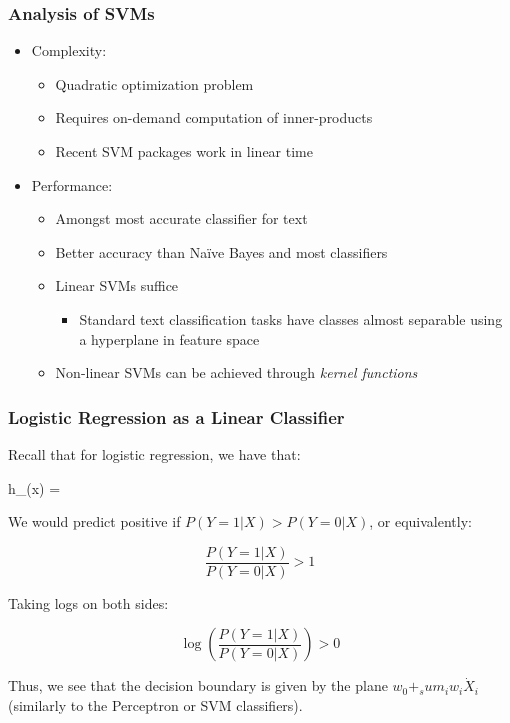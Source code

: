 \documentclass{beamer}
\begin{document}

\begin{frame} \frametitle{Analysis of SVMs}
  
  \begin{itemize}
  \item Complexity:
    \begin{itemize}
    \item Quadratic optimization problem
    \item Requires on-demand computation of inner-products
    \item Recent SVM packages work in linear time
    \end{itemize}
  \item Performance:
    \begin{itemize}
    \item Amongst most accurate classifier for text
    \item Better accuracy than Na{\"i}ve Bayes and most classifiers
    \item Linear SVMs suffice
      \begin{itemize}
      \item Standard text classification tasks have classes almost separable
        using a hyperplane in feature space
      \end{itemize}
    \item Non-linear SVMs can be achieved through \emph{kernel functions}
    \end{itemize}
  \end{itemize}

\end{frame}

\begin{frame} \frametitle{Logistic Regression as a Linear Classifier}
Recall that for logistic regression, we have that:

\begin{center}
h_{\ww}(x) = 
\end{center}

We would predict positive if $P(Y=1|X)>P(Y=0|X)$, or equivalently:

\begin{center}
\begin{equation}
\frac{P(Y=1|X)}{P(Y=0|X)} > 1
\end{equation}
\end{center}

Taking logs on both sides:

\begin{center}
\begin{equation}
\log \left( \frac{P(Y=1|X)}{P(Y=0|X)} \right) > 0
\end{equation}
\end{center}

Thus, we see that the decision boundary is given by the plane $w_0 +_sum_i w_i \dot X_i$ (similarly to the Perceptron or SVM classifiers).
\end{frame}
\end{document}
